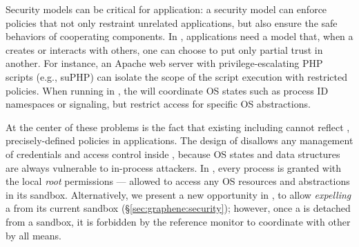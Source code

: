 Security models can be critical for application:
a security model can enforce policies that not only restraint unrelated applications,
but also ensure the safe behaviors of cooperating components.
In \liboses{}, applications need a model that,
when a \picoproc{} creates or interacts with others,
one can choose to put only partial trust in another.
For instance,
an Apache web server with privilege-escalating PHP scripts (e.g., suPHP)
can isolate the scope of
the script execution
with restricted policies.
When running in \graphene{},
the \picoprocs{} will coordinate OS states such as process ID namespaces or signaling,
but restrict access for specific OS abstractions. 




At the center of these problems is the fact that existing \liboses{} including \graphene{}
cannot reflect ,
precisely-defined policies in applications.
The design of \picoprocs{} disallows any management of credentials and access control inside \liboses{},
because OS states and data structures are always
vulnerable to in-process attackers. %
In \graphene{}, every process is granted with the local \emph{root} permissions
--- allowed to access any OS resources and abstractions
in its sandbox.
Alternatively, we present a new opportunity in \graphene{},
to allow \emph{expelling} a \picoproc{} from its current sandbox (\S\ref{sec:graphene:security});
however, once a \picoproc{} is detached from a sandbox,
it is forbidden by the reference monitor to coordinate with other \picoprocs{}
by all means.


